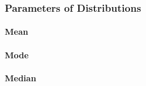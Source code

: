 



\subsubsection{Parameters of Distributions}

\paragraph{Mean}






\paragraph{Mode}

\paragraph{Median}


